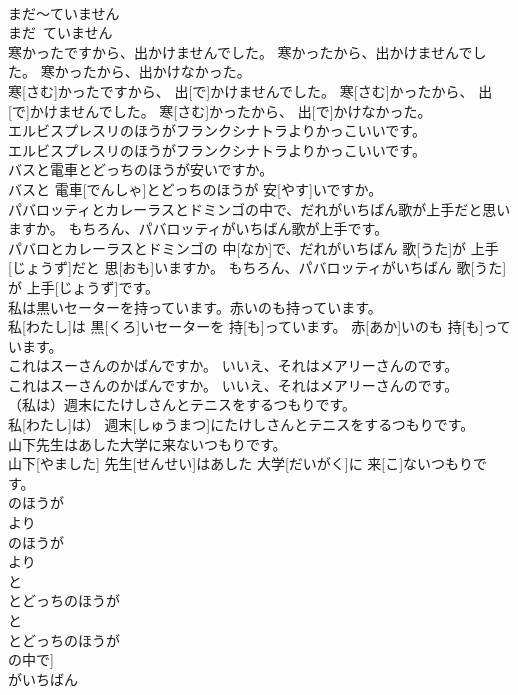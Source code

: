 \documentclass[8pt]{extreport}
\begin{document}
\begin{CJK}{UTF8}{min}
\\	まだ～ていません	
\\	まだ~ていません	
\\	寒かったですから、出かけませんでした。 寒かったから、出かけませんでした。 寒かったから、出かけなかった。	
\\	寒[さむ]かったですから、 出[で]かけませんでした。 寒[さむ]かったから、 出[で]かけませんでした。 寒[さむ]かったから、 出[で]かけなかった。	
\\	エルビスプレスリのほうがフランクシナトラよりかっこいいです。	
\\	エルビスプレスリのほうがフランクシナトラよりかっこいいです。	
\\	バスと電車とどっちのほうが安いですか。	
\\	バスと 電車[でんしゃ]とどっちのほうが 安[やす]いですか。	
\\	パバロッティとカレーラスとドミンゴの中で、だれがいちばん歌が上手だと思いますか。 もちろん、パバロッティがいちばん歌が上手です。	
\\	パバロとカレーラスとドミンゴの 中[なか]で、だれがいちばん 歌[うた]が 上手[じょうず]だと 思[おも]いますか。 もちろん、パバロッティがいちばん 歌[うた]が 上手[じょうず]です。	
\\	私は黒いセーターを持っています。赤いのも持っています。	
\\	私[わたし]は 黒[くろ]いセーターを 持[も]っています。 赤[あか]いのも 持[も]っています。	
\\	これはスーさんのかばんですか。 いいえ、それはメアリーさんのです。	
\\	これはスーさんのかばんですか。 いいえ、それはメアリーさんのです。	
\\	（私は）週末にたけしさんとテニスをするつもりです。	
\\	私[わたし]は） 週末[しゅうまつ]にたけしさんとテニスをするつもりです。	
\\	山下先生はあした大学に来ないつもりです。	
\\	山下[やました] 先生[せんせい]はあした 大学[だいがく]に 来[こ]ないつもりです。	
\\	のほうが
\\	より
\\	のほうが 
\\	より
\\	と
\\	とどっちのほうが
\\	と 
\\	とどっちのほうが
\\	の中で]
\\	がいちばん

\end{CJK}
\end{document}
